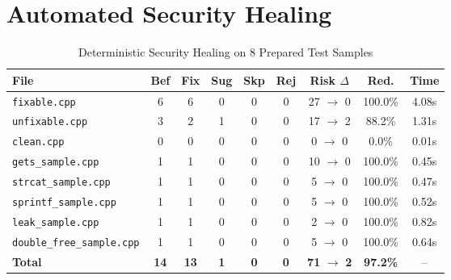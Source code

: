 \documentclass{article}
\begin{document}
\section{Automated Security Healing}
\begin{table}[htbp]
\centering
\caption{Deterministic Security Healing on 8 Prepared Test Samples}
\label{tab:healing}
\begin{tabularx}{\textwidth}{l c c c c c c c c}
\toprule
\textbf{File} & \textbf{Bef} & \textbf{Fix} & \textbf{Sug} & \textbf{Skp} & \textbf{Rej} & \textbf{Risk $\Delta$} & \textbf{Red.} & \textbf{Time} \\
\midrule
\texttt{fixable.cpp} & 6 & 6 & 0 & 0 & 0 & 27 $\rightarrow$ 0 & 100.0\% & 4.08s \\
\texttt{unfixable.cpp} & 3 & 2 & 1 & 0 & 0 & 17 $\rightarrow$ 2 & 88.2\% & 1.31s \\
\texttt{clean.cpp} & 0 & 0 & 0 & 0 & 0 & 0 $\rightarrow$ 0 & 0.0\% & 0.01s \\
\texttt{gets\_sample.cpp} & 1 & 1 & 0 & 0 & 0 & 10 $\rightarrow$ 0 & 100.0\% & 0.45s \\
\texttt{strcat\_sample.cpp} & 1 & 1 & 0 & 0 & 0 & 5 $\rightarrow$ 0 & 100.0\% & 0.47s \\
\texttt{sprintf\_sample.cpp} & 1 & 1 & 0 & 0 & 0 & 5 $\rightarrow$ 0 & 100.0\% & 0.52s \\
\texttt{leak\_sample.cpp} & 1 & 1 & 0 & 0 & 0 & 2 $\rightarrow$ 0 & 100.0\% & 0.82s \\
\texttt{double\_free\_sample.cpp} & 1 & 1 & 0 & 0 & 0 & 5 $\rightarrow$ 0 & 100.0\% & 0.64s \\
\midrule \textbf{Total} & \textbf{14} & \textbf{13} & \textbf{1} & \textbf{0} & \textbf{0} & \textbf{71} $\rightarrow$ \textbf{2} & \textbf{97.2\%} & -- \\
\bottomrule
\end{tabularx}
\end{table}
\end{document}
